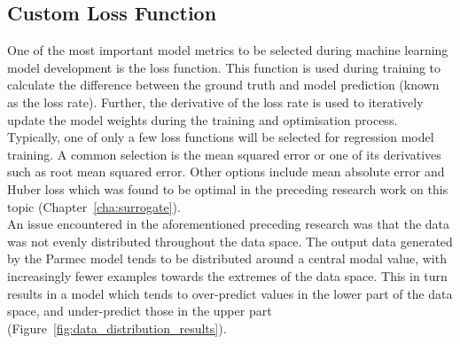 \subsection{Custom Loss Function} \label{LossFunction}

One of the most important model metrics to be selected during machine learning model development is the loss function. This function is used during training to calculate the difference between the ground truth and model prediction (known as the loss rate). Further, the derivative of the loss rate is used to iteratively update the model weights during the training and optimisation process.  
\\

\noindent
Typically, one of only a few loss functions will be selected for regression model training. A common selection is the mean squared error \cite{wallach1989mean} or one of its derivatives such as root mean squared error. Other options include mean absolute error \cite{chai2014root} and Huber loss \cite{huber1964robust} which was found to be optimal in the preceding research work on this topic (Chapter~\ref{cha:surrogate}).  
\\

\noindent
An issue encountered in the aforementioned preceding research was that the data was not evenly distributed throughout the data space. The output data generated by the Parmec model tends to be distributed around a central modal value, with increasingly fewer examples towards the extremes of the data space. This in turn results in a model which tends to over-predict values in the lower part of the data space, and under-predict those in the upper part (Figure~\ref{fig:data_distribution_results}).
\\

